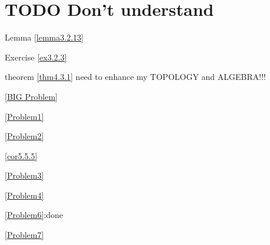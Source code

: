 \documentclass[11pt]{article}
\begin{document}
\section{{\bfseries\sffamily TODO} Don't understand}
\label{sec:org64e0c95}
Lemma \ref{lemma3.2.13}

Exercise \ref{ex3.2.3}

theorem \ref{thm4.3.1} need to enhance my TOPOLOGY and ALGEBRA!!!

\ref{BIG Problem}

\ref{Problem1}

\ref{Problem2}

\ref{cor5.5.5}

\ref{Problem3}

\ref{Problem4}



\ref{Problem6}:done

\ref{Problem7}
\end{document}
